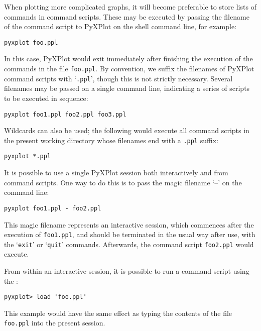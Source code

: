 When plotting more complicated graphs, it will become preferable to store lists
of commands in command scripts. These may be executed by passing the filename
of the command script to PyXPlot on the shell command line, for
example:

\begin{verbatim}
pyxplot foo.ppl
\end{verbatim}

\noindent In this case, PyXPlot would exit immediately after finishing the
execution of the commands in the file {\tt foo.ppl}. By convention, we suffix
the filenames of PyXPlot command scripts with `{\tt .ppl}', though this is
not strictly necessary. Several filenames may be passed on a single command
line, indicating a series of scripts to be executed in sequence:

\begin{verbatim}
pyxplot foo1.ppl foo2.ppl foo3.ppl
\end{verbatim}

\noindent Wildcards can also be used; the following would execute all command
scripts in the present working directory whose filenames end with a
{\tt .ppl} suffix:

\begin{verbatim}
pyxplot *.ppl
\end{verbatim}

It is possible to use a single PyXPlot session both interactively and from
command scripts. One way to do this is to pass the magic filename `--' on the
command line:

\begin{verbatim}
pyxplot foo1.ppl - foo2.ppl
\end{verbatim}

\noindent This magic filename represents an interactive session, which
commences after the execution of {\tt foo1.ppl}, and should be terminated in
the usual way after use, with the `{\tt exit}' or `{\tt quit}' commands.
Afterwards, the command script {\tt foo2.ppl} would
execute.

From within an interactive session, it is possible to run a command script
using the :

\begin{verbatim}
pyxplot> load 'foo.ppl'
\end{verbatim}

\noindent This example would have the same effect as typing the contents of the
file {\tt foo.ppl} into the present session.

